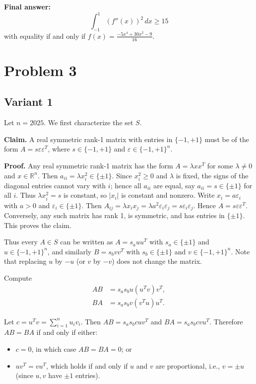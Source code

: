 \documentclass[12pt,a4paper]{article}
\theoremstyle{definition}
\begin{document}
    \textbf{Final answer:}
    $$\int_{-1}^{1} (f''(x))^2 \, dx \geq 15$$
    with equality if and only if $f(x) = \frac{-5x^4 + 30x^2 - 9}{16}$.

    \section{Problem 3}
    \subsection{Variant 1}
    Let $n = 2025$. We first characterize the set $S$.

    \textbf{Claim.} A real symmetric rank-1 matrix with entries in $\{-1, +1\}$ must be of the form
    $A = s \varepsilon \varepsilon^T$, where $s \in \{-1, +1\}$ and $\varepsilon \in \{-1, +1\}^n$.

    \textbf{Proof.} Any real symmetric rank-1 matrix has the form $A = \lambda xx^T$ for some $\lambda \neq 0$ and $x \in \mathbb{R}^n$. Then $a_{ii} = \lambda x_i^2 \in \{\pm 1\}$. Since $x_i^2 \geq 0$ and $\lambda$ is fixed, the signs of the diagonal entries cannot vary with $i$; hence all $a_{ii}$ are equal, say $a_{ii} = s \in \{\pm 1\}$ for all $i$. Thus $\lambda x_i^2 = s$ is constant, so $|x_i|$ is constant and nonzero. Write $x_i = a \varepsilon_i$ with $a > 0$ and $\varepsilon_i \in \{\pm 1\}$. Then $A_{ij} = \lambda x_i x_j = \lambda a^2 \varepsilon_i \varepsilon_j = s \varepsilon_i \varepsilon_j$. Hence $A = s \varepsilon \varepsilon^T$. Conversely, any such matrix has rank 1, is symmetric, and has entries in $\{\pm 1\}$. This proves the claim.

    Thus every $A \in S$ can be written as $A = s_a u u^T$ with $s_a \in \{\pm 1\}$ and $u \in \{-1, +1\}^n$, and similarly $B = s_b v v^T$ with $s_b \in \{\pm 1\}$ and $v \in \{-1, +1\}^n$. Note that replacing $u$ by $-u$ (or $v$ by $-v$) does not change the matrix.

    Compute
    \begin{align}
        AB &= s_a s_b u (u^T v) v^T, \\
        BA &= s_a s_b v (v^T u) u^T.
    \end{align}

    Let $c = u^T v = \sum_{i=1}^n u_i v_i$. Then $AB = s_as_b c u v^T$ and $BA = s_as_b c v u^T$. Therefore $AB = BA$ if and only if either:
    \begin{itemize}
        \item $c = 0$, in which case $AB = BA = 0$; or
        \item $u v^T = v u^T$, which holds if and only if $u$ and $v$ are proportional, i.e., $v = \pm u$ (since $u, v$ have $\pm 1$ entries).
    \end{itemize}
\end{document}
